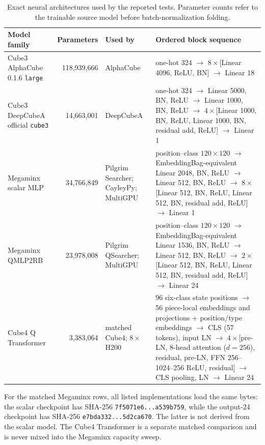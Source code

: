 \documentclass[10pt,twocolumn]{article}
\begin{document}
\begin{table}[t]
\centering
\small
\setlength{\tabcolsep}{3pt}
\caption{Exact neural architectures used by the reported tests. Parameter
counts refer to the trainable source model before batch-normalization folding.}
\label{tab:model_architectures}
\renewcommand{\arraystretch}{1.12}
\begin{tabularx}{\textwidth}{@{}L{2.6cm}rL{2.8cm}Y@{}}
\toprule
Model family & Parameters & Used by & Ordered block sequence \\
\midrule
Cube3 AlphaCube 0.1.6 \texttt{large} & 118,939,666 & AlphaCube & one-hot 324 $\to$ $8\times$[Linear 4096, ReLU, BN] $\to$ Linear 18 \\
Cube3 DeepCubeA official \texttt{cube3} & 14,663,001 & DeepCubeA & one-hot 324 $\to$ Linear 5000, BN, ReLU $\to$ Linear 1000, BN, ReLU $\to$ $4\times$[Linear 1000, BN, ReLU, Linear 1000, BN, residual add, ReLU] $\to$ Linear 1 \\
Megaminx scalar MLP & 34,766,849 & Pilgrim Searcher; CayleyPy; MultiGPU & position--class $120\times120$ $\to$ EmbeddingBag-equivalent Linear 2048, BN, ReLU $\to$ Linear 512, BN, ReLU $\to$ $8\times$[Linear 512, BN, ReLU, Linear 512, BN, residual add, ReLU] $\to$ Linear 1 \\
Megaminx QMLP2RB & 23,978,008 & Pilgrim QSearcher; MultiGPU & position--class $120\times120$ $\to$ EmbeddingBag-equivalent Linear 1536, BN, ReLU $\to$ Linear 512, BN, ReLU $\to$ $2\times$[Linear 512, BN, ReLU, Linear 512, BN, residual add, ReLU] $\to$ Linear 24 \\
Cube4 Q Transformer & 3,383,064 & matched Cube4; $8\times$H200 & 96 six-class state positions $\to$ 56 piece-local embeddings and projections + position/type embeddings $\to$ CLS (57 tokens), input LN $\to$ $4\times$[pre-LN, 8-head attention ($d=256$), residual, pre-LN, FFN 256--1024--256 ReLU, residual] $\to$ CLS pooling, LN $\to$ Linear 24 \\
\bottomrule
\end{tabularx}
\end{table}

For the matched Megaminx rows, all listed implementations load the same bytes:
the scalar checkpoint has SHA-256 \texttt{7f5071e6...a539b759}, while the
output-24 checkpoint has SHA-256 \texttt{e7bda332...5d2ca670}. The latter is
not derived from the scalar model. The Cube4 Transformer is a separate matched
comparison and is never mixed into the Megaminx capacity sweep.
\end{document}
